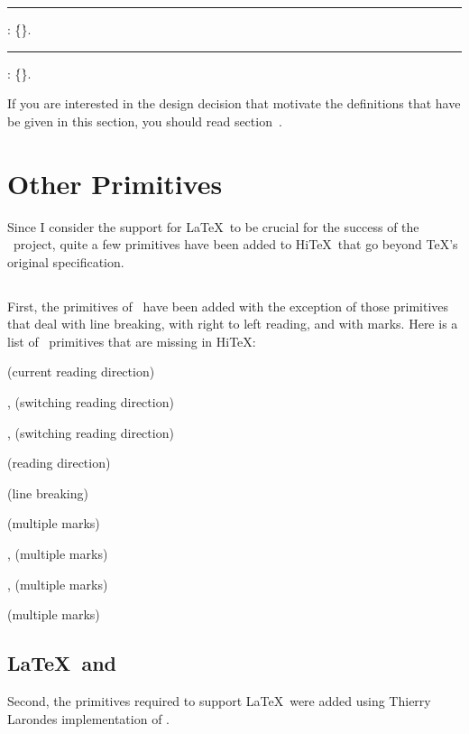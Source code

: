 \medskip{}
\rule {}:
   \opt{\.{=}} \.{\{}\.{\}}.
\rule {}:
   \opt{\.{=}} \.{\{}\.{\}}.
\medskip

If you are interested in the design decision that motivate the definitions that have
be given in this section, you should read section~.

\section{Other Primitives}

Since I consider the support for \LaTeX\ to be crucial for
the success of the \HINT\ project, quite a few primitives
have been added to Hi\TeX\ that go beyond \TeX's original
specification. 

\subsection{\eTeX}
First, the primitives of \eTeX\ have been
added with the exception of those primitives that deal with
line breaking, with right to left reading, and with marks. 
Here is a list of \eTeX\ primitives that are missing in Hi\TeX:
\itemize
\item{} (current reading direction)
\item{},   (switching reading direction)
\item{},  (switching reading direction)
\item{}  (reading direction)
\item{}  (line breaking)
\item{}  (multiple marks)
\item{},    (multiple marks)
\item{},   (multiple marks)
\item{}  (multiple marks)
\enditemize 

\subsection{\LaTeX\ and \Prote}
Second, the primitives required to support
\LaTeX\ were added using Thierry Larondes implementation of \Prote.

